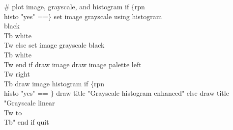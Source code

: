 \# plot image, grayscale, and histogram
if $\lbrace$rpn \\histo "yes" ==$\rbrace$
    set image grayscale using histogram \\
        black \\Tb white \\Tw
else
    set image grayscale black \\Tb white \\Tw
end if
draw image
draw image palette left \\Tw right \\Tb
draw image histogram
if $\lbrace$rpn \\histo "yes" == $\rbrace$
    draw title "Grayscale histogram enhanced"
else
    draw title "Grayscale linear \\Tw to \\Tb"
end if
quit
\endexample


\notice

\bye
